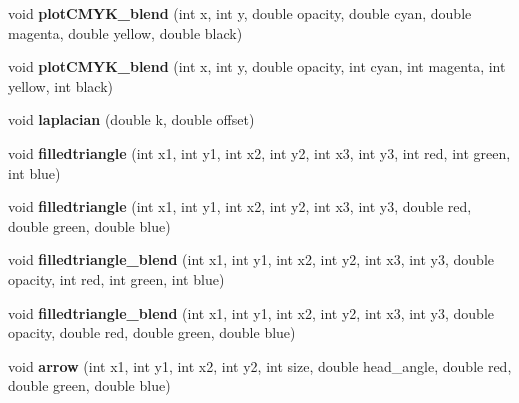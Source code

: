 \begin{DoxyCompactItemize}
\item 
\hypertarget{classpngwriter_a2e2f1a0980397f79bbde99f2bc107cf2}{}void {\bfseries plot\+C\+M\+Y\+K\+\_\+blend} (int x, int y, double opacity, double cyan, double magenta, double yellow, double black)\label{classpngwriter_a2e2f1a0980397f79bbde99f2bc107cf2}

\item 
\hypertarget{classpngwriter_a0a940f82b7c1708571710d3178aa4178}{}void {\bfseries plot\+C\+M\+Y\+K\+\_\+blend} (int x, int y, double opacity, int cyan, int magenta, int yellow, int black)\label{classpngwriter_a0a940f82b7c1708571710d3178aa4178}

\item 
\hypertarget{classpngwriter_ac6f5e073f32d82a30f2ea63a95d8a24d}{}void {\bfseries laplacian} (double k, double offset)\label{classpngwriter_ac6f5e073f32d82a30f2ea63a95d8a24d}

\item 
\hypertarget{classpngwriter_a2f0f7d51fa4c1fad77b750f7add7d991}{}void {\bfseries filledtriangle} (int x1, int y1, int x2, int y2, int x3, int y3, int red, int green, int blue)\label{classpngwriter_a2f0f7d51fa4c1fad77b750f7add7d991}

\item 
\hypertarget{classpngwriter_acb13ecbd34a978c636bd2d03a838b9ad}{}void {\bfseries filledtriangle} (int x1, int y1, int x2, int y2, int x3, int y3, double red, double green, double blue)\label{classpngwriter_acb13ecbd34a978c636bd2d03a838b9ad}

\item 
\hypertarget{classpngwriter_a98288703ddd00fa9a037dd5ced5cb1e7}{}void {\bfseries filledtriangle\+\_\+blend} (int x1, int y1, int x2, int y2, int x3, int y3, double opacity, int red, int green, int blue)\label{classpngwriter_a98288703ddd00fa9a037dd5ced5cb1e7}

\item 
\hypertarget{classpngwriter_ad1d5d6eb80e0440389c5ce1a0f27d48b}{}void {\bfseries filledtriangle\+\_\+blend} (int x1, int y1, int x2, int y2, int x3, int y3, double opacity, double red, double green, double blue)\label{classpngwriter_ad1d5d6eb80e0440389c5ce1a0f27d48b}

\item 
\hypertarget{classpngwriter_a8c9635697b53177988d54b22291778d6}{}void {\bfseries arrow} (int x1, int y1, int x2, int y2, int size, double head\+\_\+angle, double red, double green, double blue)\label{classpngwriter_a8c9635697b53177988d54b22291778d6}


\end{DoxyCompactItemize}
